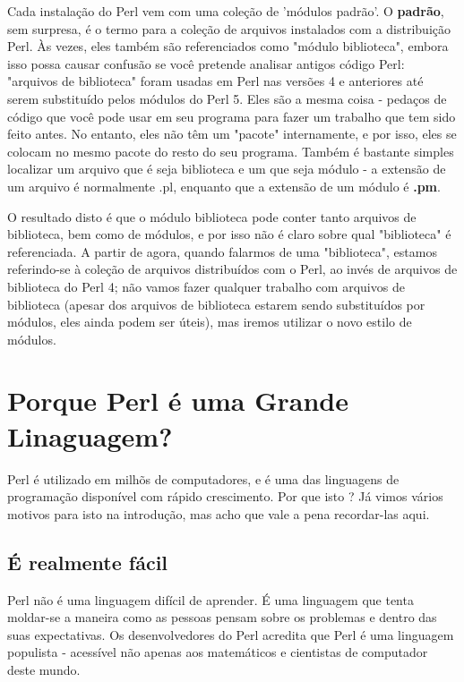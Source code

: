 \documentclass[a4paper,12pt,twoside]{book}
\begin{document}
\noindent Cada instalação do Perl vem com uma coleção de 'módulos padrão'. O \textbf{padrão}, 
sem surpresa, é o termo para a cole\c{c}ão de arquivos instalados com a distribuição Perl. Às vezes, 
eles também são referenciados como "módulo biblioteca", embora isso possa causar confusão se você 
pretende analisar antigos código Perl: "arquivos de biblioteca" foram usadas em Perl nas versões 
4 e anteriores até serem substituído pelos módulos do Perl 5. Eles são a mesma coisa - pedaços 
de código que você pode usar em seu programa para fazer um trabalho que tem sido feito antes. 
No entanto, eles não têm um "pacote" internamente, e por isso, eles se colocam no mesmo pacote 
do resto do seu programa. Também é bastante simples localizar um arquivo que é seja biblioteca 
e um que seja módulo - a extensão de um arquivo é normalmente .pl, enquanto que a extensão de 
um módulo é \textbf{.pm}.\medskip

\noindent O resultado disto é que o módulo biblioteca pode conter tanto arquivos de biblioteca, 
bem como de módulos, e por isso não é claro sobre qual "biblioteca" é referenciada. A partir de 
agora, quando falarmos de uma "biblioteca", estamos referindo-se à coleção de arquivos distribuídos 
com o Perl, ao invés de arquivos de biblioteca do Perl 4; não vamos fazer qualquer trabalho com 
arquivos de biblioteca (apesar dos arquivos de biblioteca estarem sendo substituídos por módulos, 
eles ainda podem ser úteis), mas iremos utilizar o novo estilo de módulos.

\section{Porque Perl é uma Grande Linaguagem?}

\noindent Perl é utilizado em milhõs de computadores, e é uma das linguagens de programação 
disponível com rápido crescimento. Por que isto ? Já vimos vários motivos para isto na 
introdução, mas acho que vale a pena recordar-las aqui.

\subsection{É realmente fácil}

\noindent Perl não é uma linguagem difícil de aprender. É uma linguagem que tenta moldar-se 
a maneira como as pessoas pensam sobre os problemas e dentro das suas expectativas. Os 
desenvolvedores do Perl acredita que Perl é uma linguagem populista - acessível não 
apenas aos matemáticos e cientistas de computador deste mundo.\medskip
\end{document}
